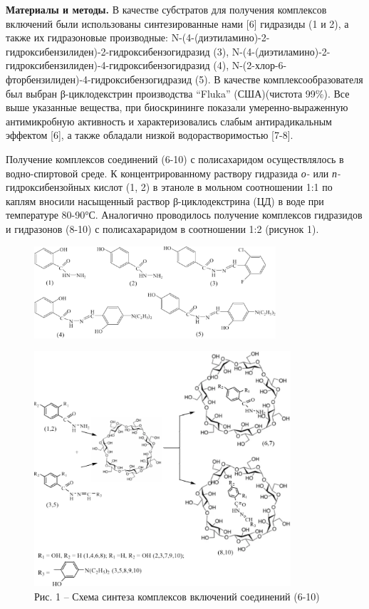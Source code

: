 \begin{multicols}{2}
{\bfseries Материалы и методы.} В качестве субстратов для получения
комплексов включений были использованы синтезированные нами {[}6{]}
гидразиды (1 и 2), а также их гидразоновые производные:
N-(4-(диэтиламино)-2-гидроксибензилиден)-2-гидроксибензогидразид (3),
N-(4-(диэтиламино)-2-гидроксибензилиден)-4-гидроксибензогидразид (4),
N-(2-хлор-6-фторбензилиден)-4-гидроксибензогидразид (5). В качестве
комплексообразователя был выбран β-циклодекстрин производства ``Fluka''
(США)(чистота 99\%). Все выше указанные вещества, при биоскрининге
показали умеренно-выраженную антимикробную активность и
характеризовались слабым антирадикальным эффектом {[}6{]}, а также
обладали низкой водорастворимостью {[}7-8{]}.

Получение комплексов соединений (6-10) с полисахаридом осуществлялось в
водно-спиртовой среде. К концентрированному раствору гидразида \emph{о-}
или \emph{п-}гидроксибензойных кислот (1, 2) в этаноле в мольном
соотношении 1:1 по каплям вносили насыщенный раствор β-циклодекстрина
(ЦД) в воде при температуре 80-90°С. Аналогично проводилось получение
комплексов гидразидов и гидразонов (8-10) с полисахараридом в
соотношении 1:2 (рисунок 1).
\end{multicols}

\begin{figure}[H]
	\centering
	\includegraphics[width=0.8\textwidth]{assets/43.1}
\end{figure}

\begin{figure}[H]
	\centering
	\includegraphics[width=0.85\textwidth]{assets/43.2}
	\caption*{Рис. 1 -- Схема синтеза комплексов включений соединений (6-10)}
\end{figure}

